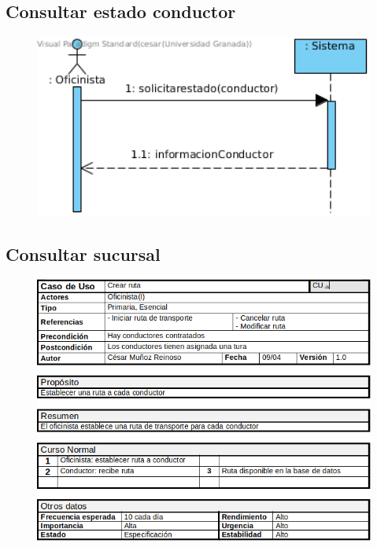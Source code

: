 \subsection{Consultar estado conductor}
\begin{figure}[H]
	\centering
	\includegraphics[width=16cm]{6}
\end{figure}
\subsection{Consultar sucursal}
\begin{figure}[H]
	\centering
	\includegraphics[width=16cm]{7}
\end{figure}
